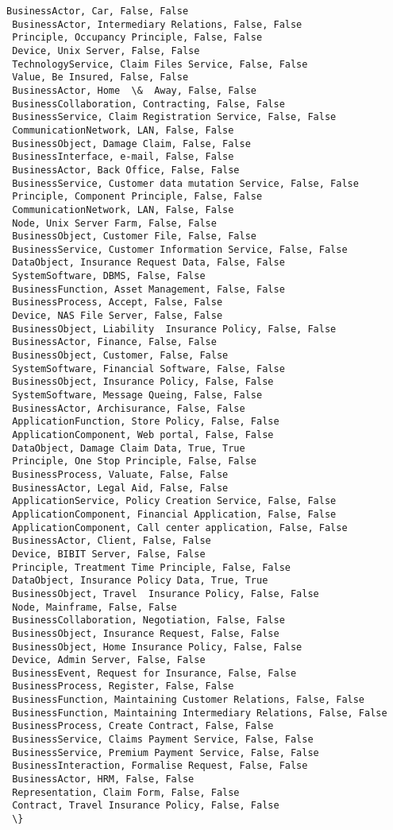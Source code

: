 \documentclass[11pt]{article}
\begin{document}
\begin{Verbatim}[commandchars=\\\{\}]
 BusinessActor, Car, False, False 
 BusinessActor, Intermediary Relations, False, False 
 Principle, Occupancy Principle, False, False 
 Device, Unix Server, False, False 
 TechnologyService, Claim Files Service, False, False 
 Value, Be Insured, False, False 
 BusinessActor, Home  \&  Away, False, False 
 BusinessCollaboration, Contracting, False, False 
 BusinessService, Claim Registration Service, False, False 
 CommunicationNetwork, LAN, False, False 
 BusinessObject, Damage Claim, False, False 
 BusinessInterface, e-mail, False, False 
 BusinessActor, Back Office, False, False 
 BusinessService, Customer data mutation Service, False, False 
 Principle, Component Principle, False, False 
 CommunicationNetwork, LAN, False, False 
 Node, Unix Server Farm, False, False 
 BusinessObject, Customer File, False, False 
 BusinessService, Customer Information Service, False, False 
 DataObject, Insurance Request Data, False, False 
 SystemSoftware, DBMS, False, False 
 BusinessFunction, Asset Management, False, False 
 BusinessProcess, Accept, False, False 
 Device, NAS File Server, False, False 
 BusinessObject, Liability  Insurance Policy, False, False 
 BusinessActor, Finance, False, False 
 BusinessObject, Customer, False, False 
 SystemSoftware, Financial Software, False, False 
 BusinessObject, Insurance Policy, False, False 
 SystemSoftware, Message Queing, False, False 
 BusinessActor, Archisurance, False, False 
 ApplicationFunction, Store Policy, False, False 
 ApplicationComponent, Web portal, False, False 
 DataObject, Damage Claim Data, True, True 
 Principle, One Stop Principle, False, False 
 BusinessProcess, Valuate, False, False 
 BusinessActor, Legal Aid, False, False 
 ApplicationService, Policy Creation Service, False, False 
 ApplicationComponent, Financial Application, False, False 
 ApplicationComponent, Call center application, False, False 
 BusinessActor, Client, False, False 
 Device, BIBIT Server, False, False 
 Principle, Treatment Time Principle, False, False 
 DataObject, Insurance Policy Data, True, True 
 BusinessObject, Travel  Insurance Policy, False, False 
 Node, Mainframe, False, False 
 BusinessCollaboration, Negotiation, False, False 
 BusinessObject, Insurance Request, False, False 
 BusinessObject, Home Insurance Policy, False, False 
 Device, Admin Server, False, False 
 BusinessEvent, Request for Insurance, False, False 
 BusinessProcess, Register, False, False 
 BusinessFunction, Maintaining Customer Relations, False, False 
 BusinessFunction, Maintaining Intermediary Relations, False, False 
 BusinessProcess, Create Contract, False, False 
 BusinessService, Claims Payment Service, False, False 
 BusinessService, Premium Payment Service, False, False 
 BusinessInteraction, Formalise Request, False, False 
 BusinessActor, HRM, False, False 
 Representation, Claim Form, False, False 
 Contract, Travel Insurance Policy, False, False 
 \} 


\end{Verbatim}
\end{document}
